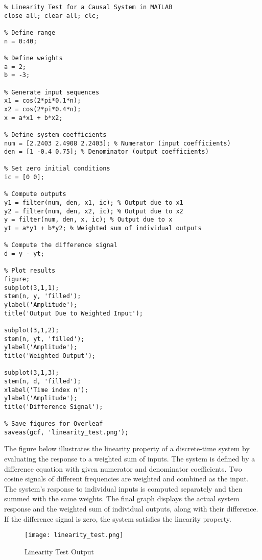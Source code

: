 \documentclass[a4paper,12pt]{article}
\begin{document}
\begin{verbatim}
% Linearity Test for a Causal System in MATLAB
close all; clear all; clc;

% Define range
n = 0:40;

% Define weights
a = 2;
b = -3;

% Generate input sequences
x1 = cos(2*pi*0.1*n);
x2 = cos(2*pi*0.4*n);
x = a*x1 + b*x2;

% Define system coefficients
num = [2.2403 2.4908 2.2403]; % Numerator (input coefficients)
den = [1 -0.4 0.75]; % Denominator (output coefficients)

% Set zero initial conditions
ic = [0 0]; 

% Compute outputs
y1 = filter(num, den, x1, ic); % Output due to x1
y2 = filter(num, den, x2, ic); % Output due to x2
y = filter(num, den, x, ic); % Output due to x
yt = a*y1 + b*y2; % Weighted sum of individual outputs

% Compute the difference signal
d = y - yt; 

% Plot results
figure;
subplot(3,1,1);
stem(n, y, 'filled');
ylabel('Amplitude');
title('Output Due to Weighted Input');

subplot(3,1,2);
stem(n, yt, 'filled');
ylabel('Amplitude');
title('Weighted Output');

subplot(3,1,3);
stem(n, d, 'filled');
xlabel('Time index n');
ylabel('Amplitude');
title('Difference Signal');

% Save figures for Overleaf
saveas(gcf, 'linearity_test.png');  
\end{verbatim}

The figure below illustrates the linearity property of a discrete-time system by evaluating the response to a weighted sum of inputs. The system is defined by a difference equation with given numerator and denominator coefficients. Two cosine signals of different frequencies are weighted and combined as the input. The system's response to individual inputs is computed separately and then summed with the same weights. The final graph displays the actual system response and the weighted sum of individual outputs, along with their difference. If the difference signal is zero, the system satisfies the linearity property.


\begin{figure}[H]
    \centering
    \texttt{[image: linearity\_test.png]}
    \caption{Linearity Test Output}
    \label{fig:linearity}
\end{figure}
\end{document}
